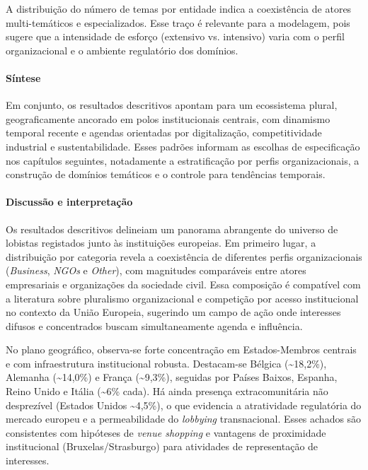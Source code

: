 A distribuição do número de temas por entidade indica a coexistência de atores multi-temáticos e especializados. Esse traço é relevante para a modelagem, pois sugere que a intensidade de esforço (extensivo vs. intensivo) varia com o perfil organizacional e o ambiente regulatório dos domínios.

\paragraph{Síntese}
Em conjunto, os resultados descritivos apontam para um ecossistema plural, geograficamente ancorado em polos institucionais centrais, com dinamismo temporal recente e agendas orientadas por digitalização, competitividade industrial e sustentabilidade. Esses padrões informam as escolhas de especificação nos capítulos seguintes, notadamente a estratificação por perfis organizacionais, a construção de domínios temáticos e o controle para tendências temporais.

\paragraph{Discussão e interpretação}
Os resultados descritivos delineiam um panorama abrangente do universo de lobistas registados junto às instituições europeias. Em primeiro lugar, a distribuição por categoria revela a coexistência de diferentes perfis organizacionais (\textit{Business}, \textit{NGOs} e \textit{Other}), com magnitudes comparáveis entre atores empresariais e organizações da sociedade civil. Essa composição é compatível com a literatura sobre pluralismo organizacional e competição por acesso institucional no contexto da União Europeia, sugerindo um campo de ação onde interesses difusos e concentrados buscam simultaneamente agenda e influência.

No plano geográfico, observa-se forte concentração em Estados-Membros centrais e com infraestrutura institucional robusta. Destacam-se Bélgica (\textasciitilde18,2\%), Alemanha (\textasciitilde14,0\%) e França (\textasciitilde9,3\%), seguidas por Países Baixos, Espanha, Reino Unido e Itália (\textasciitilde6\% cada). Há ainda presença extracomunitária não desprezível (Estados Unidos \textasciitilde4,5\%), o que evidencia a atratividade regulatória do mercado europeu e a permeabilidade do \textit{lobbying} transnacional. Esses achados são consistentes com hipóteses de \textit{venue shopping} e vantagens de proximidade institucional (Bruxelas/Strasburgo) para atividades de representação de interesses.

